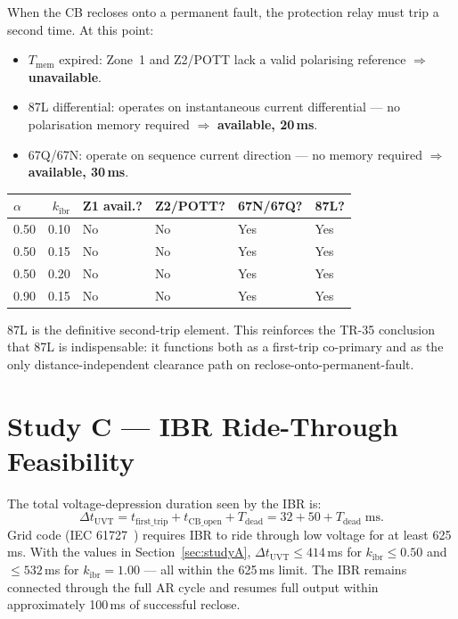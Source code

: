 \documentclass[11pt,a4paper]{article}
\begin{document}
When the CB recloses onto a permanent fault, the protection relay must trip
a second time.  At this point:
\begin{itemize}
  \item $T_\mathrm{mem}$ expired: Zone~1 and Z2/POTT lack a valid polarising
    reference $\Rightarrow$ \textbf{unavailable}.
  \item 87L differential: operates on instantaneous current differential ---
    no polarisation memory required $\Rightarrow$ \textbf{available, 20\,ms}.
  \item 67Q/67N: operate on sequence current direction --- no memory
    required $\Rightarrow$ \textbf{available, 30\,ms}.
\end{itemize}

\begin{center}
\begin{tabular}{@{}lrllll@{}}
\toprule
$\alpha$ & $k_\mathrm{ibr}$ & Z1 avail.? & Z2/POTT? & 67N/67Q? & 87L? \\
\midrule
0.50 & 0.10 & No & No & Yes & Yes \\
0.50 & 0.15 & No & No & Yes & Yes \\
0.50 & 0.20 & No & No & Yes & Yes \\
0.90 & 0.15 & No & No & Yes & Yes \\
\bottomrule
\end{tabular}
\end{center}

\medskip\noindent
87L is the definitive second-trip element.  This reinforces the TR-35
conclusion~\cite{SAMBP_TR35} that 87L is indispensable: it functions both as a
first-trip co-primary and as the only distance-independent clearance path on
reclose-onto-permanent-fault.

\section{Study C --- IBR Ride-Through Feasibility}
\label{sec:studyC}

The total voltage-depression duration seen by the IBR is:
\begin{equation}
  \Delta t_\mathrm{UVT} = t_\mathrm{first\_trip} + t_\mathrm{CB\_open}
  + T_\mathrm{dead}
  = 32 + 50 + T_\mathrm{dead}\;\text{ms}.
  \label{eq:uvt}
\end{equation}
Grid code (IEC 61727~\cite{IEC_61727}) requires IBR to ride through low voltage
for at least 625\,ms.  With the values in Section~\ref{sec:studyA},
$\Delta t_\mathrm{UVT}\leq414$\,ms for $k_\mathrm{ibr}\leq0.50$ and
$\leq532$\,ms for $k_\mathrm{ibr}=1.00$ --- all within the 625\,ms limit.
The IBR remains connected through the full AR cycle and resumes full output
within approximately 100\,ms of successful reclose.
\end{document}
